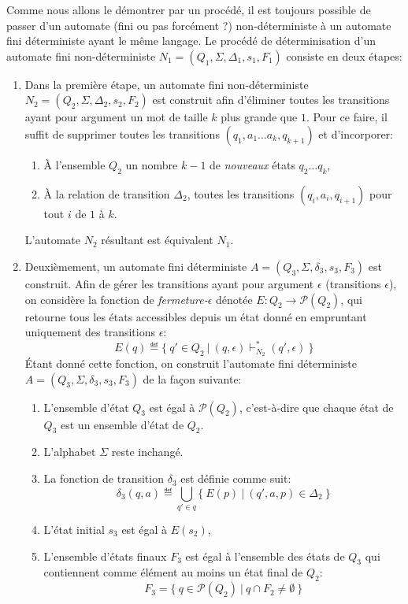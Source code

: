 Comme nous allons le démontrer par un procédé, il est toujours possible de passer d'un automate (fini ou pas forcément ?) non-déterministe à un automate fini déterministe ayant le même langage.
Le procédé de \og déterminisation \fg{} d'un automate fini non-déterministe $N_1 = (Q_1, \Sigma, \Delta_1, s_1, F_1)$ consiste en deux étapes:
\begin{enumerate}
\item
Dans la première étape, un automate fini non-déterministe $N_2 = (Q_2, \Sigma, \Delta_2, s_2, F_2)$  est construit afin d'éliminer toutes les transitions ayant pour argument un mot de taille $k$ plus grande que $1$. Pour ce faire, il suffit de supprimer toutes les transitions $(q_1, a_1 \dots a_k, q_{k+1})$ et d'incorporer:
\begin{enumerate}
\item À l'ensemble $Q_2$ un nombre $k-1$ de \textit{nouveaux} états $q_2 \dots q_k$,
\item À la relation de transition $\Delta_2$, toutes les transitions $(q_i, a_i, q_{i+1})$ pour tout $i$ de $1$ à $k$.
\end{enumerate}
L'automate $N_2$ résultant est équivalent $N_1$.
\item
Deuxièmement, un automate fini déterministe $A = (Q_3, \Sigma, \delta_3, s_3, F_3)$  est construit.
Afin de gérer les transitions ayant pour argument $\epsilon$ (transitions $\epsilon$), on considère la fonction de \og \textit{fermeture-$\epsilon$} \fg{} dénotée $E : Q_2 \to \mathcal{P}(Q_2)$, qui retourne tous les états accessibles depuis un état donné en empruntant uniquement des transitions $\epsilon$:
\[
E(q) \eqdef \{\ q' \in Q_2\ |\ (q, \epsilon) \vdash_{N_2}^* (q', \epsilon)\ \} 
\]
Étant donné cette fonction, on construit l'automate fini déterministe $A = (Q_3, \Sigma, \delta_3, s_3, F_3)$ de la façon suivante:
\begin{enumerate}
\item L'ensemble d'état $Q_3$ est égal à $\mathcal{P}(Q_2)$, c'est-à-dire que chaque état de $Q_3$ est un ensemble d'état de $Q_2$.
\item L'alphabet $\Sigma$ reste inchangé.
\item La fonction de transition $\delta_3$ est définie comme suit:
\[
\delta_3(q, a) \eqdef \bigcup_{q' \in q} \{\ E(p)\ |\ (q', a, p) \in \Delta_2\ \}
\]
\item L'état initial $s_3$ est égal à $E(s_2)$,
\item L'ensemble d'états finaux $F_3$ est égal à l'ensemble des états de $Q_3$ qui contiennent comme élément au moins un état final de $Q_2$:
\[
F_3 = \{\ q \in \mathcal{P}(Q_2)\ |\ q \cap F_2 \neq \emptyset\ \}
\] 
\end{enumerate}
\end{enumerate}

